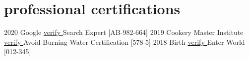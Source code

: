 \section{professional certifications}

\begin{entrylist}
\entry
{2020}
{Google}
{{\href{https://123256346545.com}{verify \faCertificate}}}
{Search Expert [AB-982-664]}
\entry
{2019}
{Cookery Master Institute}
{{\href{https://987654321.com}{verify \faCertificate}}}
{Avoid Burning Water Certification [578-5]}
\entry
{2018}
{Birth}
{{\href{https://123256346545.com}{verify \faCertificate}}}
{Enter World [012-345]}
\end{entrylist}

